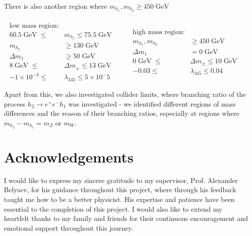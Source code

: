 \documentclass[12pt]{article}
\newcommand{\gev}{\mathrel{\text{ GeV}}}
\newcommand{\gevs}{\mathrel{\text{ GeV }}}
\newcommand{\mhone}{m_{h_1}}
\newcommand{\mhtwo}{m_{h_2}}
\begin{document}
There is also another region where $\mhone, \mhtwo \geq 450 \gev$

\begin{equation}
    {
        \begin{split}
            \\ \text{low mass region:}& 
            \\ 60.5 \gevs \leq &\mhone \leq 75.5 \gevs
            \\  \mhtwo &\geq 130 \gev 
            \\  \Delta m_1 & \geq 50 \gev
            \\ 8 \gevs\leq &\Delta m_\pm \leq 13\gev
            \\ -1 \times 10 ^{-3}\leq &\lambda_{345} \leq 5 \times 10^-5
        \end{split}
        }
        \qquad
    {
        \begin{split}
            \\ \text{high mass region:}&
            \\   \mhone, \mhtwo &\geq 450 \gev
            \\   \Delta m_1 & = 0 \gev
            \\0 \gevs\leq &\Delta m_\pm \leq 10\gev
            \\ -0.03 \leq &\lambda_{345} \leq 0.04
        \end{split}
    \text{ }}
\end{equation}

Apart from this, we also investigated collider limits, where branching ratio of the process $h_2\rightarrow e^+e^-h_1$ was investigated - we identified different regions of mass differences and the reason of their branching ratios, especially at regions where $\mhtwo - \mhone = m_Z$ or $m_W$.


\section{Acknowledgements}
I would like to express my sincere gratitude to my supervisor, Prof. Alexander Belyaev, for his guidance throughout this project, where through his feedback taught me how to be a better physicist. His expertise and patience have been essential to the completion of this project. I would also like to extend my heartfelt thanks to my family and friends for their continuous encouragement and emotional support throughout this journey.
\onecolumn
\newpage

 
\end{document}
